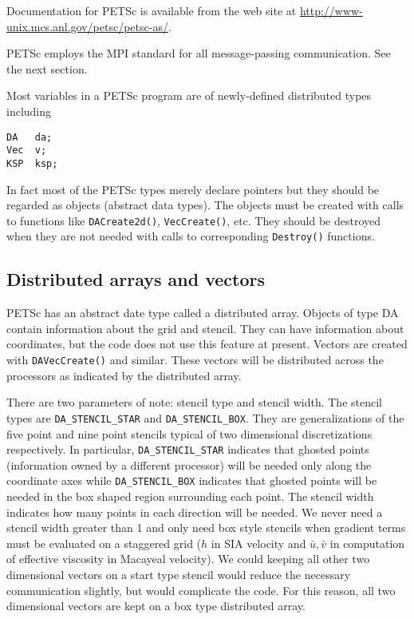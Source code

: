 \documentclass[11pt,final]{amsart}
\renewcommand{\t}[1]{\texttt{#1}}
\begin{document}
Documentation for PETSc is available from the web site at \url{http://www-unix.mcs.anl.gov/petsc/petsc-as/}.

PETSc employs the MPI standard for all message-passing communication.  See the next section.

Most variables in a PETSc program are of newly-defined distributed types including
\begin{verbatim}
DA   da;
Vec  v;
KSP  ksp;
\end{verbatim}
In fact most of the PETSc types merely declare pointers but they should be regarded as objects (abstract data types).  The objects must be created with calls to functions like \t{DACreate2d()}, \t{VecCreate()}, etc.  They should be destroyed when they are not needed with calls to corresponding \t{Destroy()} functions.

\subsection{Distributed arrays and vectors}
PETSc has an abstract date type called a distributed array. Objects of type DA contain
information about the grid and stencil. They can have information about coordinates, but
the code does not use this feature at present. Vectors are created with
\texttt{DAVecCreate()} and similar. These vectors will be distributed across the
processors as indicated by the distributed array.

There are two parameters of note: stencil type and stencil width. The stencil types are
\verb|DA_STENCIL_STAR| and \verb|DA_STENCIL_BOX|. They are generalizations of the five
point and nine point stencils typical of two dimensional discretizations respectively. In
particular, \verb|DA_STENCIL_STAR| indicates that ghosted points (information owned by a
different processor) will be needed only along the coordinate axes while
\verb|DA_STENCIL_BOX| indicates that ghosted points will be needed in the box shaped
region surrounding each point. The stencil width indicates how many points in each
direction will be needed. We never need a stencil width greater than 1 and only need box
style stencils when gradient terms must be evaluated on a staggered grid ($h$ in SIA
velocity and $\bar{u},\bar{v}$ in computation of effective viscosity in Macayeal
velocity). We could keeping all other two dimensional vectors on a start type stencil
would reduce the necessary communication slightly, but would complicate the code. For this
reason, all two dimensional vectors are kept on a box type distributed array.
\end{document}
